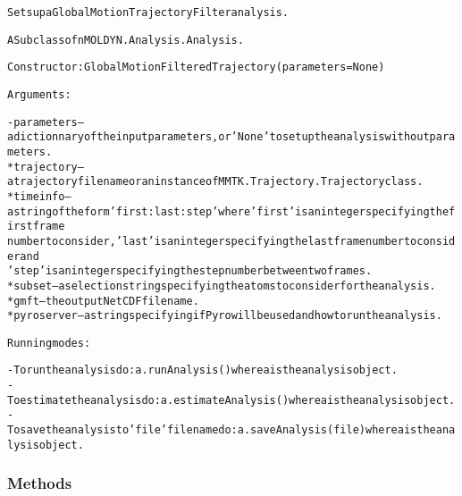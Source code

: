 \begin{alltt}
Sets up a Global Motion Trajectory Filter analysis.

A Subclass of nMOLDYN.Analysis.Analysis. 

Constructor: GlobalMotionFilteredTrajectory({\textbar}parameters{\textbar} = None)

Arguments:

    - {\textbar}parameters{\textbar} -- a dictionnary of the input parameters, or 'None' to set up the analysis without parameters.
        * trajectory -- a trajectory file name or an instance of MMTK.Trajectory.Trajectory class.
        * timeinfo   -- a string of the form 'first:last:step' where 'first' is an integer specifying the first frame 
                        number to consider, 'last' is an integer specifying the last frame number to consider and 
                        'step' is an integer specifying the step number between two frames.
        * subset     -- a selection string specifying the atoms to consider for the analysis.
        * gmft       -- the output NetCDF file name.
        * pyroserver -- a string specifying if Pyro will be used and how to run the analysis.
    
Running modes:

    - To run the analysis do: a.runAnalysis() where a is the analysis object.
    - To estimate the analysis do: a.estimateAnalysis() where a is the analysis object.
    - To save the analysis to 'file' file name do: a.saveAnalysis(file) where a is the analysis object.
\end{alltt}



  \subsubsection{Methods}

    \vspace{0.5ex}

